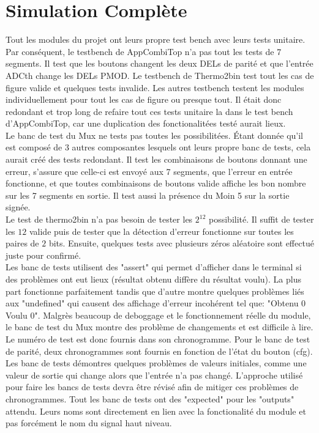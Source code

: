 \documentclass[a11paper]{article}
\begin{document}
\section{Simulation Complète}
Tout les modules du projet ont leurs propre test bench avec leurs tests unitaire. Par conséquent, le testbench de AppCombiTop n'a pas
tout les tests de 7 segments. Il test que les boutons changent les deux DELs de parité et que l'entrée ADCth change les DELs PMOD.
Le testbench de Thermo2bin test tout les cas de figure valide et quelques tests invalide. Les autres testbench testent les modules
individuellement pour tout les cas de figure ou presque tout. Il était donc redondant et trop long de refaire tout ces tests unitaire la
dans le test bench d'AppCombiTop, car une duplication des fonctionalitées testé aurait lieux.
\\
Le banc de test du Mux ne tests pas toutes les possibilitées. Étant donnée qu'il est composé de 3 autres composantes lesquels ont leurs
propre banc de tests, cela aurait créé des tests redondant. Il test les combinaisons de boutons donnant une erreur,
s'assure que celle-ci est envoyé aux 7 segments, que l'erreur en entrée fonctionne, et que toutes combinaisons de boutons valide affiche
les bon nombre sur les 7 segments en sortie. Il test aussi la présence du Moin 5 sur la sortie signée.
\\
Le test de thermo2bin n'a pas besoin de tester les $2^{12}$ possibilité. Il suffit de tester les $12$ valide puis de tester que la
détection d'erreur fonctionne sur toutes les paires de $2$ bits. Ensuite, quelques tests avec plusieurs zéros aléatoire sont effectué
juste pour confirmé.
\\
Les banc de tests utilisent des "assert" qui permet d'afficher dans le terminal si des problèmes ont eut lieux (résultat obtenu diffère
du résultat voulu). La plus part fonctionne parfaitement tandis que d'autre montre quelques problèmes liés aux "undefined" qui causent des
affichage d'erreur incohérent tel que: "Obtenu 0 Voulu 0". Malgrès beaucoup de deboggage et le fonctionnement réelle du module, le banc de
test du Mux montre des problème de changements et est difficile à lire. Le numéro de test est donc fournis dans son chronogramme. Pour le
banc de test de parité, deux chronogrammes sont fournis en fonction de l'état du bouton (cfg). Les banc de tests démontres quelques
problèmes de valeurs initiales, comme une valeur de sortie qui change alors que l'entrée n'a pas changé. L'approche utilisé pour faire
les bancs de tests devra être révisé afin de mitiger ces problèmes de chronogrammes. Tout les banc de tests ont des "expected" pour les
"outputs" attendu. Leurs noms sont directement en lien avec la fonctionalité du module et pas forcément le nom du signal haut niveau.
\end{document}
